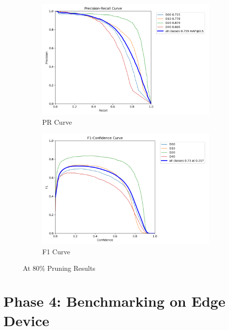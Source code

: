 \begin{figure}[H]
    \centering
    \begin{subfigure}{0.5\linewidth}
        \centering
        \includegraphics[width=\linewidth]{figures/80pruned/PR_curve.png}
        \caption{PR Curve}
    \end{subfigure}
    \hfill
    \begin{subfigure}{0.5\linewidth}
        \centering
        \includegraphics[width=\linewidth]{figures/80pruned/F1_curve.png}
        \caption{F1 Curve}
    \end{subfigure}
    \caption{At 80\% Pruning Results}

\end{figure}



\section{Phase 4: Benchmarking on Edge Device}
